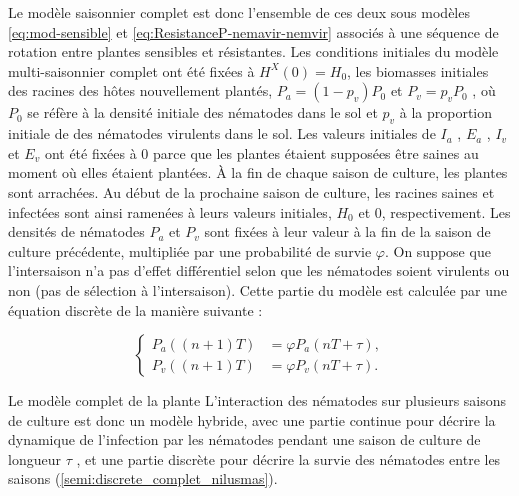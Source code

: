 	Le modèle saisonnier complet est donc l'ensemble de ces deux sous modèles \eqref{eq:mod-sensible} et   \eqref{eq:ResistanceP-nemavir-nemvir} associés à une séquence de rotation entre plantes sensibles et résistantes.
Les conditions initiales du modèle multi-saisonnier complet ont été fixées à $H^X (0) = H_0$, les
biomasses initiales des racines des hôtes nouvellement plantés, $P_a = (1-p_v)P_0$ et $P_v = p_v P_0$ , où
$P_0$ se réfère à la densité initiale des nématodes dans le sol et $p_v$ à la proportion initiale de
des nématodes virulents dans le sol. Les valeurs initiales de $I_a$ , $E_a$ , $I_v$ et $E_v$ ont été fixées à 0 parce que les plantes étaient supposées être saines au moment où elles étaient plantées.
À la fin de chaque saison de culture, les plantes sont arrachées. Au début de la prochaine
saison de culture, les racines saines et infectées sont ainsi ramenées à leurs valeurs initiales, $H_0$ et
0, respectivement. Les densités de nématodes $P_a$ et $P_v$ sont fixées à leur valeur à la fin de la
saison de culture précédente, multipliée par une probabilité de survie $\varphi$. On suppose que l'intersaison n'a pas d'effet différentiel selon que les nématodes soient virulents ou non (pas de sélection à l'intersaison).
Cette partie du modèle est calculée par une équation discrète de la manière suivante :
	 
	
	\begin{equation}
		\left\{
		 \begin{aligned}
		    P_a ((n+1)T) &= \varphi P_a(nT + \tau),\\
		    P_v ((n+1)T) &= \varphi P_v(nT + \tau).
		 \end{aligned}
		\right.
		\label{eq:intersaison-nemavir-nemvir}
	\end{equation}

	
	
	Le modèle complet de la plante L'interaction des nématodes sur plusieurs saisons de culture est donc un modèle hybride, avec une
partie continue pour décrire la dynamique de l'infection par les nématodes pendant une saison de culture
de longueur $\tau$ , et une partie discrète pour décrire la survie des nématodes entre les saisons (\autoref{semi:discrete_complet_nilusmas}).
	
	
	
